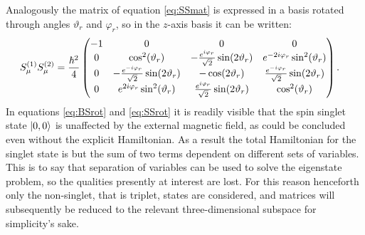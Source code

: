 \documentclass[a4paper]{article}
\begin{document}
Analogously the matrix of equation \ref{eq:SSmat} is expressed in a basis rotated through
angles \(\vartheta_r\) and \(\varphi_r\), so in the \(z\)-axis basis it can be written:
\begin{align}\label{eq:SSrot}
        S^{(1)}_\mu S^{(2)}_\mu &= \frac{\hbar{}^2}{4}\pmqty{-1 & 0 & 0 & 0\\
                0 & \cos[2](\vartheta_r) & -\frac{e^{i\varphi_r}}{\sqrt{2}
                }\sin(2\vartheta_r) & e^{-2i\varphi_r}\sin[2](\vartheta_r)\\
                0 & -\frac{e^{-i\varphi_r}}{\sqrt{2}
                }\sin(2\vartheta_r) & -\cos(2\vartheta_r) & \frac{e^{-i\varphi_r}}{\sqrt{2}
        }\sin(2\vartheta_r)\\
        0 & e^{2i\varphi_r}\sin[2](\vartheta_r) & \frac{e^{i\varphi_r}}{\sqrt{2}
        }\sin(2\vartheta_r) & \cos[2](\vartheta_r)}
.\end{align}
In equations \ref{eq:BSrot} and \ref{eq:SSrot} it is readily visible that the spin singlet state \(\ket{0, 0}\) is unaffected by
the external magnetic field, as could be concluded even without the explicit Hamiltonian.
As a result the total Hamiltonian for the singlet state is but the sum of two terms
dependent on different sets of variables. This is to say that separation of variables can
be used to solve the eigenstate problem, so the qualities presently at interest are lost.
For this reason henceforth only the non-singlet, that is triplet, states are considered,
and matrices will subsequently be reduced to the relevant three-dimensional subspace for
simplicity's sake.
\end{document}
